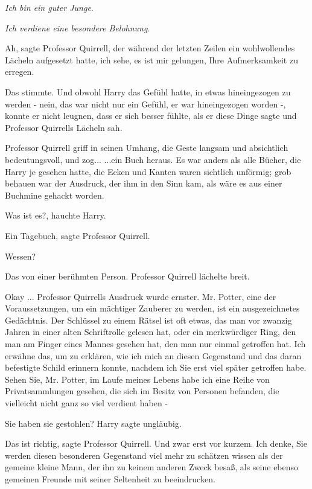 \glqq \emph{Ich bin ein guter Junge}.\grqq{}

\glqq \emph{Ich verdiene eine besondere Belohnung}.\grqq{}

\glqq Ah\grqq{}, sagte Professor Quirrell, der während der letzten Zeilen ein
wohlwollendes Lächeln aufgesetzt hatte, \glqq ich sehe, es ist mir gelungen,
Ihre Aufmerksamkeit zu erregen.\grqq{}

Das stimmte. Und obwohl Harry das Gefühl hatte, in etwas hineingezogen zu werden
- nein, das war nicht nur ein Gefühl, er war hineingezogen worden -, konnte er
nicht leugnen, dass er sich besser fühlte, als er diese Dinge sagte und
Professor Quirrells Lächeln sah.

Professor Quirrell griff in seinen Umhang, die Geste langsam und absichtlich
bedeutungsvoll, und zog... ...ein Buch heraus. Es war anders als alle Bücher,
die Harry je gesehen hatte, die Ecken und Kanten waren sichtlich unförmig; grob
behauen war der Ausdruck, der ihm in den Sinn kam, als wäre es aus einer
Buchmine gehackt worden.

\glqq Was ist es?\grqq{}, hauchte Harry.

\glqq Ein Tagebuch\grqq{}, sagte Professor Quirrell.

\glqq Wessen?\grqq{}

\glqq Das von einer berühmten Person.\grqq{} Professor Quirrell lächelte breit.

\glqq Okay ...\grqq{} Professor Quirrells Ausdruck wurde ernster. \glqq Mr.
Potter, eine der Voraussetzungen, um ein mächtiger Zauberer zu werden, ist ein
ausgezeichnetes Gedächtnis. Der Schlüssel zu einem Rätsel ist oft etwas, das man
vor zwanzig Jahren in einer alten Schriftrolle gelesen hat, oder ein
merkwürdiger Ring, den man am Finger eines Mannes gesehen hat, den man nur
einmal getroffen hat. Ich erwähne das, um zu erklären, wie ich mich an diesen
Gegenstand und das daran befestigte Schild erinnern konnte, nachdem ich Sie erst
viel später getroffen habe. Sehen Sie, Mr. Potter, im Laufe meines Lebens habe
ich eine Reihe von Privatsammlungen gesehen, die sich im Besitz von Personen
befanden, die vielleicht nicht ganz so viel verdient haben -\grqq{}

\glqq Sie haben sie gestohlen?\grqq{} Harry sagte ungläubig.

\glqq Das ist richtig\grqq{}, sagte Professor Quirrell. \glqq Und zwar erst vor
kurzem. Ich denke, Sie werden diesen besonderen Gegenstand viel mehr zu schätzen
wissen als der gemeine kleine Mann, der ihn zu keinem anderen Zweck besaß, als
seine ebenso gemeinen Freunde mit seiner Seltenheit zu beeindrucken.\grqq{}

